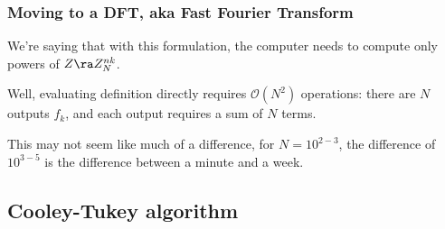 \documentclass[hyperref={colorlinks=true}]{beamer}
\begin{document}

\begin{frame}%
  \frametitle{Moving to a  DFT, aka Fast Fourier Transform}

  We're saying that with this formulation, the computer needs to compute only powers of $Z \ra Z_{N}^{nk}$. 
  
  \mysp
  
  \begin{center}  \end{center}
  
  \pause
  
  \mysp
  
  Well, evaluating  definition directly requires $\mathcal{O}(N^2)$ operations: there are $N$ outputs $f_k$, and each output requires a sum of $N$ terms. 
  
  \pause
  
  \mysp
  
  \begin{center}  \end{center}
  
  \pause
  
  \mysp
  
  This may not seem like much of a difference, for $N = 10^{2-3}$, the difference of $10^{3-5}$ is the difference between a minute and a week. 
  
  \begin{center}  \end{center}

\end{frame}

\subsection[Cooley-Tukey algorithm]{Cooley-Tukey algorithm}
\end{document}
